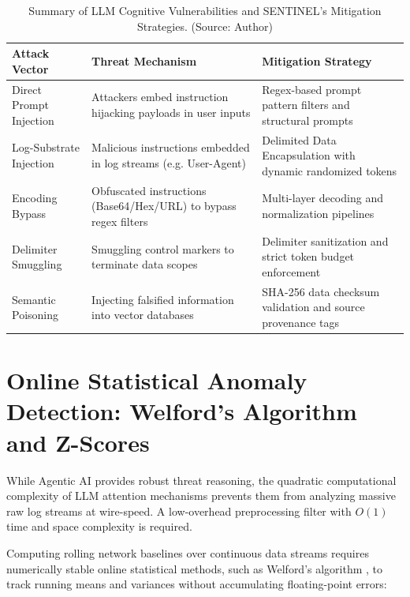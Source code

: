 \begin{table}[!htbp]
    \centering
    \caption{Summary of LLM Cognitive Vulnerabilities and SENTINEL's Mitigation Strategies. (Source: Author)}
    \label{tab:vulnerabilities_mitigations}
    \begin{tabular}{|>{\raggedright\arraybackslash}p{}|>{\raggedright\arraybackslash}p{}|>{\raggedright\arraybackslash}p{}|}
        \hline
        \textbf{Attack Vector} & \textbf{Threat Mechanism} & \textbf{Mitigation Strategy} \\
        \hline
        Direct Prompt Injection & Attackers embed instruction hijacking payloads in user inputs & Regex-based prompt pattern filters and structural prompts \\
        \hline
        Log-Substrate Injection & Malicious instructions embedded in log streams (e.g. User-Agent) & Delimited Data Encapsulation with dynamic randomized tokens \\
        \hline
        Encoding Bypass & Obfuscated instructions (Base64/Hex/URL) to bypass regex filters & Multi-layer decoding and normalization pipelines \\
        \hline
        Delimiter Smuggling & Smuggling control markers to terminate data scopes & Delimiter sanitization and strict token budget enforcement \\
        \hline
        Semantic Poisoning & Injecting falsified information into vector databases & SHA-256 data checksum validation and source provenance tags \\
        \hline
    \end{tabular}
\end{table}

\section{Online Statistical Anomaly Detection: Welford's Algorithm and Z-Scores}
\label{sec:welford}

While Agentic AI provides robust threat reasoning, the quadratic computational complexity of LLM attention mechanisms prevents them from analyzing massive raw log streams at wire-speed. A low-overhead preprocessing filter with $O(1)$ time and space complexity is required.

Computing rolling network baselines over continuous data streams requires numerically stable online statistical methods, such as Welford's algorithm \cite{welford1962}, to track running means and variances without accumulating floating-point errors:

